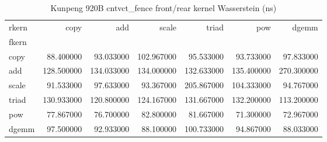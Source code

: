\begin{table}
\caption{Kunpeng 920B cntvct_fence front/rear kernel Wasserstein (ns)}
\begin{tabular}{lrrrrrr}
\toprule
rkern & copy & add & scale & triad & pow & dgemm \\
fkern &  &  &  &  &  &  \\
\midrule
copy & 88.400000 & 93.033000 & 102.967000 & 95.533000 & 93.733000 & 97.833000 \\
add & 128.500000 & 134.033000 & 134.000000 & 132.633000 & 135.400000 & 270.300000 \\
scale & 91.533000 & 97.633000 & 93.367000 & 205.867000 & 104.333000 & 94.767000 \\
triad & 130.933000 & 120.800000 & 124.167000 & 131.667000 & 132.200000 & 113.200000 \\
pow & 77.867000 & 76.700000 & 82.800000 & 81.667000 & 71.300000 & 72.967000 \\
dgemm & 97.500000 & 92.933000 & 88.100000 & 100.733000 & 94.867000 & 88.033000 \\
\bottomrule
\end{tabular}
\end{table}
